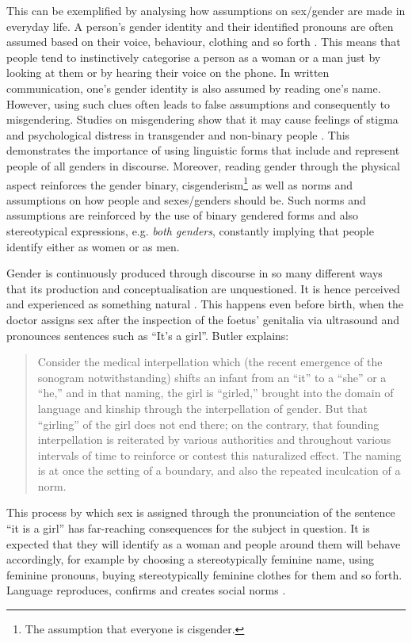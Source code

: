 This can be exemplified by analysing how assumptions on sex/gender are made in everyday life. A person’s gender identity and their identified pronouns are often assumed based on their voice, behaviour, clothing and so forth \citep[32]{prona2016mein}. This means that people tend to instinctively categorise a person as a woman or a man just by looking at them or by hearing their voice on the phone. In written communication, one's gender identity is also assumed by reading one's name. However, using such clues often leads to false assumptions and consequently to misgendering. Studies on misgendering show that it may cause feelings of stigma and psychological distress in transgender and non-binary people \citep{mclemore2015experiences,mclemore2018minority}. This demonstrates the importance of using linguistic forms that include and represent people of all genders in discourse. Moreover, reading gender through the physical aspect reinforces the gender binary, cisgenderism\footnote{The assumption that everyone is cisgender.} as well as norms and assumptions on how people and sexes/genders should be. Such norms and assumptions are reinforced by the use of binary gendered forms and also stereotypical expressions, e.g. \textit{both genders}, constantly implying that people identify either as women or as men. 

Gender is continuously produced through discourse in so many different ways that its production and conceptualisation are unquestioned. It is hence perceived and experienced as something natural \citep[24f]{hornscheidt2008gender}. This happens even before birth, when the doctor assigns sex after the inspection of the foetus' genitalia via ultrasound and pronounces sentences such as ``It's a girl''. Butler explains:
\begin{quote}
Consider the medical interpellation which (the recent emergence of the sonogram notwithstanding) shifts an infant from an ``it'' to a ``she'' or a ``he,'' 
and in that naming, the girl is ``girled,'' %
brought into the domain of language and kinship through the interpellation of gender. But that ``girling'' of the girl does not end there; on the contrary, that founding interpellation is reiterated by various authorities and throughout various intervals of time to reinforce or contest this naturalized effect. The naming is at once the setting of a boundary, and also the repeated inculcation of a norm. \citep[7--8]{butler2003bodies}
\end{quote}

\noindent This process by which sex is assigned through the pronunciation of the sentence ``it is a girl'' has far-reaching consequences for the subject in question. It is expected that they will identify as a woman and people around them will behave accordingly, for example by choosing a stereotypically feminine name, using feminine pronouns, buying stereotypically feminine clothes for them and so forth. Language reproduces, confirms and creates social norms \citep[11]{sprachhandeln2015tun}. 

